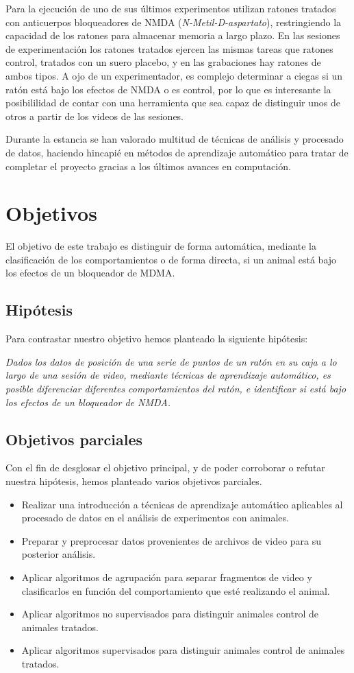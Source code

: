 Para la ejecución de uno de sus últimos experimentos utilizan ratones tratados con anticuerpos bloqueadores de NMDA (\textit{N-Metil-D-aspartato}), restringiendo la capacidad de los ratones para almacenar memoria a largo plazo. En las sesiones de experimentación los ratones tratados ejercen las mismas tareas que ratones control, tratados con un suero placebo, y en las grabaciones hay ratones de ambos tipos. A ojo de un experimentador, es complejo determinar a ciegas si un ratón está bajo los efectos de NMDA o es control, por lo que es interesante la posibililidad de contar con una herramienta que sea capaz de distinguir unos de otros a partir de los videos de las sesiones.

Durante la estancia se han valorado multitud de técnicas de análisis y procesado de datos, haciendo hincapié en métodos de aprendizaje automático para tratar de completar el proyecto gracias a los últimos avances en computación.

\section{Objetivos} \label{sec:objetivos}
El objetivo de este trabajo es distinguir de forma automática, mediante la clasificación de los comportamientos o de forma directa, si un animal está bajo los efectos de un bloqueador de MDMA.

\subsection{Hipótesis}
Para contrastar nuestro objetivo hemos planteado la siguiente hipótesis:

\textit{Dados los datos de posición de una serie de puntos de un ratón en su caja a lo largo de una sesión de video, mediante técnicas de aprendizaje automático, es posible diferenciar diferentes comportamientos del ratón, e identificar si está bajo los efectos de un bloqueador de NMDA.}

\subsection{Objetivos parciales}
Con el fin de desglosar el objetivo principal, y de poder corroborar o refutar nuestra hipótesis, hemos planteado varios objetivos parciales.

\begin{itemize}
    \item Realizar una introducción a técnicas de aprendizaje automático aplicables al procesado de datos en el análisis de experimentos con animales.
    \item Preparar y preprocesar datos provenientes de archivos de video para su posterior análisis.
    \item Aplicar algoritmos de agrupación para separar fragmentos de video y clasificarlos en función del comportamiento que esté realizando el animal.
    \item Aplicar algoritmos no supervisados para distinguir animales control de animales tratados.
    \item Aplicar algoritmos supervisados para distinguir animales control de animales tratados.
\end{itemize}


